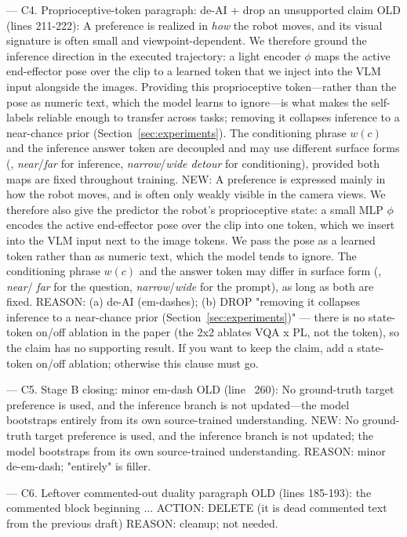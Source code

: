 --- C4.  Proprioceptive-token paragraph: de-AI + drop an unsupported claim
OLD (lines 211-222):
  A preference is realized in \emph{how} the robot moves, and its visual signature
  is often small and viewpoint-dependent. We therefore ground the inference
  direction in the executed trajectory: a light encoder $\phi$ maps the
  active end-effector pose over the clip to a learned token that we inject into the
  VLM input alongside the images. Providing this proprioceptive token---rather than
  the pose as numeric text, which the model learns to ignore---is what makes the
  self-labels reliable enough to transfer across tasks; removing it collapses
  inference to a near-chance prior (Section~\ref{sec:experiments}). The
  conditioning phrase $w(c)$ and the inference answer token are decoupled and may
  use different surface forms (\eg{}, \emph{near}/\emph{far} for inference,
  \emph{narrow}/\emph{wide detour} for conditioning), provided both maps are fixed
  throughout training.
NEW:
  A preference is expressed mainly in how the robot moves, and is often only
  weakly visible in the camera views. We therefore also give the predictor the
  robot's proprioceptive state: a small MLP $\phi$ encodes the active
  end-effector pose over the clip into one token, which we insert into the VLM
  input next to the image tokens. We pass the pose as a learned token rather than
  as numeric text, which the model tends to ignore. The conditioning phrase
  $w(c)$ and the answer token may differ in surface form (\eg, \emph{near}/%
  \emph{far} for the question, \emph{narrow}/\emph{wide} for the prompt), as long
  as both are fixed.
REASON: (a) de-AI (em-dashes); (b) DROP "removing it collapses inference to a
  near-chance prior (Section~\ref{sec:experiments})" — there is no state-token
  on/off ablation in the paper (the 2x2 ablates VQA x PL, not the token), so
  the claim has no supporting result. If you want to keep the claim, add a
  state-token on/off ablation; otherwise this clause must go.


--- C5.  Stage B closing: minor em-dash
OLD (line ~260):
  No ground-truth target preference is used, and the inference branch is not
  updated---the model bootstraps entirely from its own source-trained
  understanding.
NEW:
  No ground-truth target preference is used, and the inference branch is not
  updated; the model bootstraps from its own source-trained understanding.
REASON: minor de-em-dash; "entirely" is filler.


--- C6.  Leftover commented-out duality paragraph
OLD (lines 185-193): the commented block beginning
  ... %
ACTION: DELETE  (it is dead commented text from the previous draft)
REASON: cleanup; not needed.


